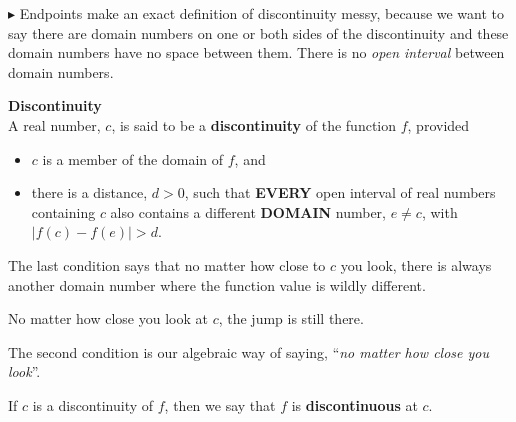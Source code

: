 \documentclass{ximera}
\begin{document}
$\blacktriangleright$ Endpoints make an exact definition of discontinuity messy, because we want to say there are domain numbers on one or both sides of the discontinuity and these domain numbers have no space between them.  There is no \textit{open interval} between domain numbers.







\begin{definition} \textbf{\textcolor{green!50!black}{Discontinuity}}  \\

A real number, $c$, is said to be a \textbf{discontinuity} of the function $f$, provided

\begin{itemize}
\item $c$ is a member of the domain of $f$, and


\item there is a distance, $d > 0$, such that \textbf{\textcolor{purple!85!blue}{EVERY}} open interval of real numbers containing $c$ also contains a different \textbf{\textcolor{purple!85!blue}{DOMAIN}} number, $e \ne c$, with $ |f(c) - f(e)| > d $.

\end{itemize}



\end{definition}




The last condition says that no matter how close to $c$ you look, there is always another domain number where the function value is wildly different.

No matter how close you look at $c$, the jump is still there.


The second condition is our algebraic way of saying, ``\textit{no matter how close you look}''.












If $c$ is a discontinuity of $f$, then we say that $f$ is \textbf{discontinuous} at $c$.
\end{document}
